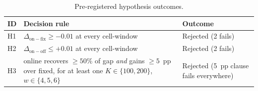 \begin{table}[!t]
 \caption{Pre-registered hypothesis outcomes.}
 \label{tab:hypotheses}
 \centering
 \small
 \setlength{\tabcolsep}{4pt}
 \begin{tabular}{@{}p{0.5cm}p{4.8cm}p{2.3cm}@{}}
 \toprule
 \textbf{ID} & \textbf{Decision rule} & \textbf{Outcome} \\
 \midrule
 H1 & $\Delta_{\mathrm{on-fix}} \geq -0.01$ at every cell-window & Rejected (2 fails) \\
 H2 & $\Delta_{\mathrm{on-off}} \leq +0.01$ at every cell-window & Rejected (2 fails) \\
 H3 & online recovers $\geq 50\%$ of gap \textit{and} gains $\geq 5$~pp over fixed, for at least one $K\in\{100,200\}$, $w\in\{4,5,6\}$ & Rejected (5~pp clause fails everywhere) \\
 \bottomrule
 \end{tabular}
\end{table}
